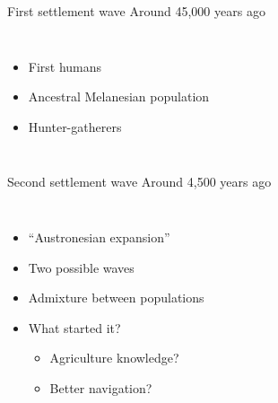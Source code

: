 \documentclass[10pt, aspectratio=43]{beamer}
\begin{document}
\addtocounter{framenumber}{-1}
\begin{frame}{}{First settlement wave Around 45,000 years ago}
\vspace*{-0.8cm}
\begin{columns}

  \color{masseyWhite}
  \begin{itemize}
    \item First humans
    \item Ancestral Melanesian population
    \item Hunter-gatherers
  \end{itemize}

\end{columns}
\end{frame}

\addtocounter{framenumber}{-1}
\begin{frame}{}{Second settlement wave Around 4,500 years ago}
\vspace*{-0.8cm}
\begin{columns}

  \color{masseyWhite}
  \begin{itemize}
    \item “Austronesian expansion”
    \item Two possible waves
    \item Admixture between populations
    \item What started it?
    \begin{itemize}
      \item Agriculture knowledge?
      \item Better navigation?
    \end{itemize}
  \end{itemize}

\end{columns}
\end{frame}
\end{document}
